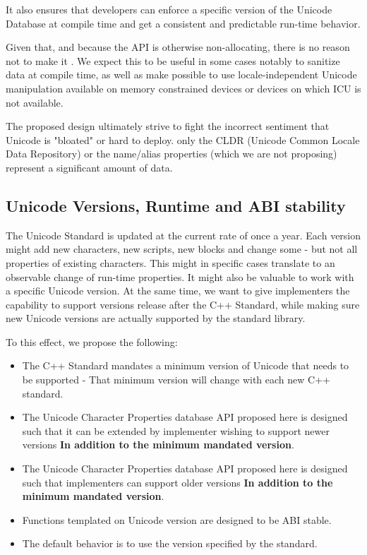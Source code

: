 \documentclass{wg21}
\begin{document}
It also ensures that developers can enforce a specific version of the Unicode Database at compile time and get a
consistent and predictable run-time behavior.

Given that, and because the API is otherwise non-allocating, there is no reason not to make it .
We expect this to be useful in some cases notably to sanitize data at compile time, as well as make possible to use 
locale-independent Unicode manipulation available on memory constrained devices or devices on which ICU is not available.

The proposed design ultimately strive to fight the incorrect sentiment that Unicode is "bloated" or hard to deploy.
only the CLDR (Unicode Common Locale Data Repository) or the name/alias properties (which we are not proposing) represent
a significant amount of data.


\subsection{Unicode Versions, Runtime and ABI stability}

The Unicode Standard is updated at the current rate of once a year.
Each version might add new characters, new scripts, new blocks and change some - but not all
properties of existing characters.
This might in specific cases translate to an observable change of run-time properties.
It might also be valuable to work with a specific Unicode version.
At the same time, we want to give implementers the capability to support versions release after the C++ Standard,
while making sure new Unicode versions are actually supported by the standard library.

To this effect, we propose the following:

\begin{itemize}
    \item The C++ Standard mandates a minimum version of Unicode that needs to be supported - That minimum version will change with each new C++ standard.
    \item The Unicode Character Properties database API proposed here is designed such that it can be extended by implementer wishing to support newer versions \textbf{In addition to the minimum mandated version}.
    \item The Unicode Character Properties database API proposed here is designed such that implementers can support older versions \textbf{In addition to the minimum mandated version}.
    \item Functions templated on Unicode version are designed to be ABI stable.
    \item The default behavior is to use the version specified by the standard.
\end{itemize}
\end{document}
